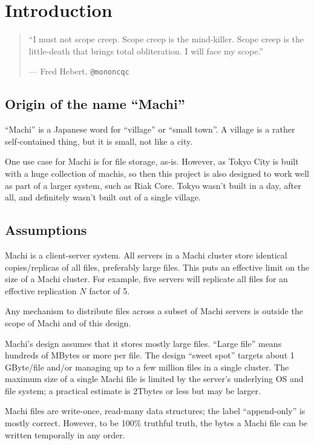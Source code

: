 \documentclass[preprint,10pt]{sigplanconf}
\begin{document}
\section{Introduction}
\label{sec:introduction}

\begin{quotation}
``I must not scope creep. Scope creep is the mind-killer. Scope creep
  is the little-death that brings total obliteration. I will face my
  scope.''
\par 
\hfill{--- Fred Hebert, {\tt @mononcqc}}
\end{quotation}
\subsection{Origin of the name ``Machi''}
\label{sub:name}

``Machi'' is a Japanese word for
``village'' or ``small town''.  A village is a rather self-contained
thing, but it is small, not like a city.

One use case for Machi is for file storage, as-is.  However, as Tokyo
City is built with a huge collection of machis, so then this project
is also designed to work well as part of a larger system, such as Riak
Core.  Tokyo wasn't built in a day, after all, and definitely wasn't
built out of a single village.

\subsection{Assumptions}
\label{sub:assumptions}

Machi is a client-server system.  All servers in a Machi cluster store
identical copies/replicas of all files, preferably large files.
This puts an effective limit on the size of a Machi cluster.
For example, five servers will replicate all files
for an effective replication $N$ factor of 5.

Any mechanism to distribute files across a subset of Machi
servers is outside the scope of Machi and of this design.

Machi's design assumes that it stores mostly large files.
``Large file'' means hundreds of MBytes or more
per file.  The design ``sweet spot'' targets about
1 GByte/file and/or managing up to a few million files in a
single cluster.  The maximum size of a single Machi file is
limited by the server's underlying OS and file system; a
practical estimate is 2Tbytes or less but may be larger.

Machi files are write-once, read-many data structures; the label
``append-only'' is mostly correct.  However, to be 100\% truthful
truth, the bytes a Machi file can be written temporally in any order.
\end{document}
